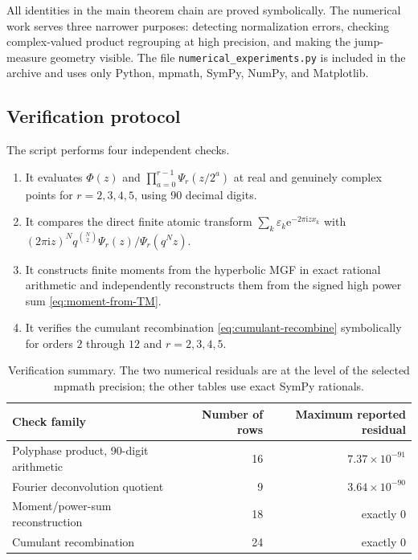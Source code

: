 \documentclass[11pt,oneside]{article}
\numberwithin{equation}{section}
\theoremstyle{definition}
\theoremstyle{remark}
\newcommand{\e}{\mathrm e}
\newcommand{\ii}{\mathrm i}
\newcommand{\eps}{\varepsilon}
\begin{document}
All identities in the main theorem chain are proved symbolically.  The
numerical work serves three narrower purposes: detecting normalization errors,
checking complex-valued product regrouping at high precision, and making the
jump-measure geometry visible.  The file
\texttt{numerical\_experiments.py} is included in the archive and uses only
Python, mpmath, SymPy, NumPy, and Matplotlib.

\subsection{Verification protocol}

The script performs four independent checks.
\begin{enumerate}
\item It evaluates $\Phi(z)$ and
$\prod_{a=0}^{r-1}\Psi_r(z/2^a)$ at real and genuinely complex points for
$r=2,3,4,5$, using 90 decimal digits.
\item It compares the direct finite atomic transform
$\sum_k\eps_k\e^{-2\pi\ii zx_k}$ with
$(2\pi\ii z)^Nq^{\binom N2}\Psi_r(z)/\Psi_r(q^Nz)$.
\item It constructs finite moments from the hyperbolic MGF in exact rational
arithmetic and independently reconstructs them from the signed high power sum
\eqref{eq:moment-from-TM}.
\item It verifies the cumulant recombination
\eqref{eq:cumulant-recombine} symbolically for orders $2$ through $12$ and
$r=2,3,4,5$.
\end{enumerate}

\begin{table}[htbp]
\centering
\begin{tabular}{@{}lrr@{}}
\toprule
Check family & Number of rows & Maximum reported residual\\
\midrule
Polyphase product, 90-digit arithmetic & 16 & $7.37\times10^{-91}$\\
Fourier deconvolution quotient & 9 & $3.64\times10^{-90}$\\
Moment/power-sum reconstruction & 18 & exactly $0$\\
Cumulant recombination & 24 & exactly $0$\\
\bottomrule
\end{tabular}
\caption{Verification summary.  The two numerical residuals are at the level
of the selected mpmath precision; the other tables use exact SymPy rationals.}
\label{tab:verification-summary}
\end{table}
\end{document}
